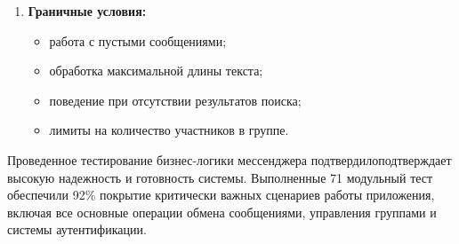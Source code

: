 \begin{enumerate}
	\item \textbf{Граничные условия:}
	\begin{itemize}
		\item работа с пустыми сообщениями;
		\item обработка максимальной длины текста;
		\item поведение при отсутствии результатов поиска;
		\item лимиты на количество участников в группе.
	\end{itemize}
\end{enumerate}

Проведенное тестирование бизнес-логики мессенджера подтвердилоподтверждает высокую надежность и готовность системы. Выполненные 71 модульный тест обеспечили 92\% покрытие критически важных сценариев работы приложения, включая все основные операции обмена сообщениями, управления группами и системы аутентификации.